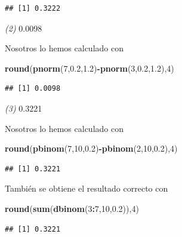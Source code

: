 \documentclass[]{book}
\newenvironment{Shaded}{\begin{snugshade}}{\end{snugshade}}
\newcommand{\DecValTok}[1]{\textcolor[rgb]{0.00,0.00,0.81}{#1}}
\newcommand{\FloatTok}[1]{\textcolor[rgb]{0.00,0.00,0.81}{#1}}
\newcommand{\KeywordTok}[1]{\textcolor[rgb]{0.13,0.29,0.53}{\textbf{#1}}}
\newcommand{\NormalTok}[1]{#1}
\newcommand{\OperatorTok}[1]{\textcolor[rgb]{0.81,0.36,0.00}{\textbf{#1}}}
\theoremstyle{definition}
\theoremstyle{definition}
\theoremstyle{definition}
\theoremstyle{remark}
\begin{document}
\begin{verbatim}
## [1] 0.3222
\end{verbatim}

\emph{(2)} 0.0098

Nosotros lo hemos calculado con

\begin{Shaded}
\begin{Highlighting}[]
\KeywordTok{round}\NormalTok{(}\KeywordTok{pnorm}\NormalTok{(}\DecValTok{7}\NormalTok{,}\FloatTok{0.2}\NormalTok{,}\FloatTok{1.2}\NormalTok{)}\OperatorTok{-}\KeywordTok{pnorm}\NormalTok{(}\DecValTok{3}\NormalTok{,}\FloatTok{0.2}\NormalTok{,}\FloatTok{1.2}\NormalTok{),}\DecValTok{4}\NormalTok{)}
\end{Highlighting}
\end{Shaded}

\begin{verbatim}
## [1] 0.0098
\end{verbatim}

\emph{(3)} 0.3221

Nosotros lo hemos calculado con

\begin{Shaded}
\begin{Highlighting}[]
\KeywordTok{round}\NormalTok{(}\KeywordTok{pbinom}\NormalTok{(}\DecValTok{7}\NormalTok{,}\DecValTok{10}\NormalTok{,}\FloatTok{0.2}\NormalTok{)}\OperatorTok{-}\KeywordTok{pbinom}\NormalTok{(}\DecValTok{2}\NormalTok{,}\DecValTok{10}\NormalTok{,}\FloatTok{0.2}\NormalTok{),}\DecValTok{4}\NormalTok{)}
\end{Highlighting}
\end{Shaded}

\begin{verbatim}
## [1] 0.3221
\end{verbatim}

También se obtiene el resultado correcto con

\begin{Shaded}
\begin{Highlighting}[]
\KeywordTok{round}\NormalTok{(}\KeywordTok{sum}\NormalTok{(}\KeywordTok{dbinom}\NormalTok{(}\DecValTok{3}\OperatorTok{:}\DecValTok{7}\NormalTok{,}\DecValTok{10}\NormalTok{,}\FloatTok{0.2}\NormalTok{)),}\DecValTok{4}\NormalTok{)}
\end{Highlighting}
\end{Shaded}

\begin{verbatim}
## [1] 0.3221
\end{verbatim}
\end{document}
